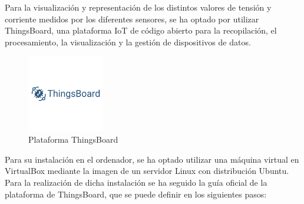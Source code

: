 Para la visualización y representación de los distintos valores de tensión y corriente medidos por los diferentes sensores, se ha optado por utilizar ThingsBoard, una plataforma IoT de código abierto para la recopilación, el procesamiento, la visualización y la gestión de dispositivos de datos.

\begin{figure}[H]
    \centering
    \includegraphics[width=0.3\textwidth]{images/3-software/3-2-2-thingsboard/LogoThingsboard.png}
    \caption{Plataforma ThingsBoard}
    \label{fig:3-2-2-ThingsBoard}
\end{figure}

Para su instalación en el ordenador, se ha optado utilizar una máquina virtual en VirtualBox mediante la imagen de un servidor Linux con distribución Ubuntu. Para la realización de dicha instalación se ha seguido la guía oficial de la plataforma de ThingsBoard, que se puede definir en los siguientes pasos:

